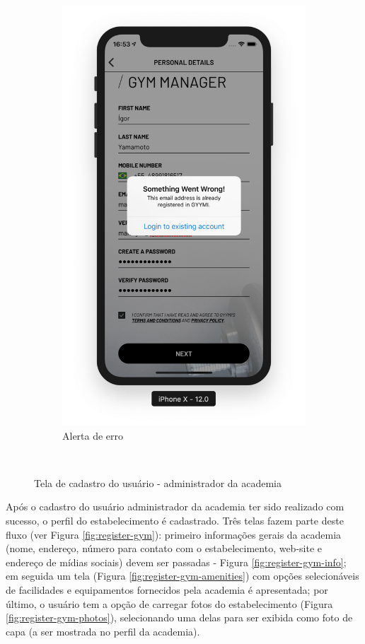 \begin{figure}[H]
\begin{subfigure}[b]{0.4\textwidth}
        \includegraphics[width=\textwidth]{pfc/figuras/register-manager-error.png}
        \caption{Alerta de erro}
        \label{fig:register-manager-error}
    \end{subfigure}
    ~
    \caption{Tela de cadastro do usuário - administrador da academia}
    \label{fig:register-manager}
\end{figure}

Após o cadastro do usuário administrador da academia ter sido realizado com sucesso, o perfil do estabelecimento é cadastrado. Três telas fazem parte deste fluxo (ver Figura \ref{fig:register-gym}): primeiro informações gerais da academia (nome, endereço, número para contato com o estabelecimento, web-site e endereço de mídias sociais) devem ser passadas - Figura \ref{fig:register-gym-info}; em seguida um tela (Figura \ref{fig:register-gym-amenities}) com opções selecionáveis de facilidades e equipamentos fornecidos pela academia é apresentada; por último, o usuário tem a opção de carregar fotos do estabelecimento (Figura \ref{fig:register-gym-photos}), selecionando uma delas para ser exibida como foto de capa (a ser mostrada no perfil da academia).

